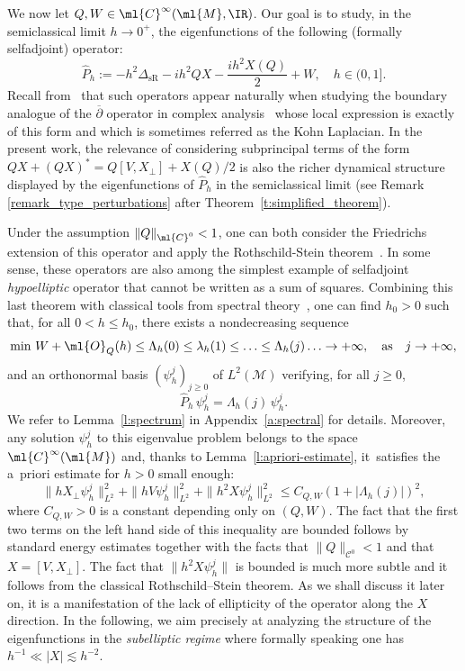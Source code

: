 \documentclass[JEP,XML,SOM,Unicode, NoEqCountersInSection,published]{cedram}
\theoremstyle{plain}
\theoremstyle{definition}
\theoremstyle{remark}
\begin{document}
We now let $Q, W\in\ml{C}^{\infty}(\ml{M},\IR)$. Our goal is to study, in the semiclassical limit $h\to 0^+$, the eigenfunctions of the following (formally selfadjoint) operator:
\begin{equation}
\label{e:main_operator}
\widehat{P}_h:=-h^2\Delta_{\text{sR}}-ih^2QX -\frac{ih^2X(Q)}{2}+W, \quad h \in (0,1].
\end{equation}
Recall from~\cite[\S1]{RothschildStein76} that such operators appear naturally when studying the boundary analogue of the $\overline{\partial}$ operator in complex analysis~\cite{FollandStein74} whose local expression is exactly of this form and which is sometimes referred as the Kohn Laplacian. In the present work, the relevance of considering subprincipal terms of the form $QX+(QX)^*=Q[V,X_\perp]+X(Q)/2$ is also the richer dynamical structure displayed by the eigenfunctions of $\widehat{P}_h$ in the semiclassical limit (see Remark \ref{remark_type_perturbations} after Theorem~\ref{t:simplified_theorem}).

Under the assumption $\|Q\|_{\ml{C}^0}<1$, one can both consider the Friedrichs extension of this operator and apply the Rothschild-Stein theorem~\cite[Th.\,16]{RothschildStein76}. In some sense, these operators are also among the simplest example of selfadjoint \emph{hypoelliptic} operator that cannot be written as a sum of squares. Combining this last theorem with classical tools from spectral theory~\cite{ReedSimon80, ReedSimon75}, one can find $h_0 > 0$ such that, for all $0<h\leq h_0$, there exists a nondecreasing sequence
\[
\text{min}\ W+\ml{O}_Q(h)\leq \Lambda_h(0)\leq \lambda_h(1)\leq\ldots \leq \Lambda_h(j)\ldots \to +\infty,\quad\text{as}\quad j\to +\infty,
\]
and an orthonormal basis $(\psi_h^j)_{j\geq 0}$ of $L^2(\mathcal{M})$ verifying, for all $j\geq 0$,
\begin{equation}\label{e:semiclassical-basis}
\widehat{P}_h \, \psi_h^j =\Lambda_h(j) \,\psi_h^j.
\end{equation}
We refer to Lemma~\ref{l:spectrum} in Appendix~\ref{a:spectral} for details. Moreover, any solution $\psi_h^j$ to this eigenvalue problem belongs to the space $\ml{C}^{\infty}(\ml{M})$ and, thanks to Lemma~\ref{l:apriori-estimate}, it~satisfies the a~priori estimate for $h>0$ small enough:
\[
\|hX_\perp\psi_h^j\|_{L^2}^2+\|hV\psi_h^j\|_{L^2}^2+\|h^2X\psi_h^j\|_{L^2}^2\leq C_{Q,W}(1+|\Lambda_h(j)|)^2,
\]
where $C_{Q,W}>0$ is a constant depending only on $(Q,W)$. The fact that the first two terms on the left hand side of this inequality are bounded follows by standard energy estimates together with the facts that $\|Q\|_{\mathcal{C}^0}<1$ and that $X=[V,X_\perp]$. The fact that $\|h^2X\psi_h^j\|$ is bounded is much more subtle and it follows from the classical Rothschild--Stein theorem. As we shall discuss it later on, it is a manifestation of the lack of ellipticity of the operator along the $X$ direction. In the following, we aim precisely at analyzing the structure of the eigenfunctions in the \textit{subelliptic regime} where formally speaking one has $h^{-1}\ll |X|\lesssim h^{-2}$.
\end{document}
